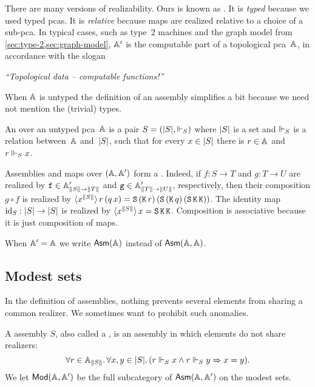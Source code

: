 There are many versions of realizability. Ours is known as . It is \emph{typed}
because we used typed pcas. It is \emph{relative} because maps are realized relative to a choice of a sub-pca. In
typical cases, such as type~2 machines and the graph model from \cref{sec:type-2,sec:graph-model}, $\subAA$ is the
computable part of a topological pca~$\AA$, in accordance with the slogan
%
\begin{center}
  \emph{``Topological data -- computable functions!''}
\end{center}

When $\AA$ is untyped the definition of an assembly simplifies a bit because we need not mention the (trivial) types.

\begin{definition}
  An  over an untyped pca~$\AA$ is a pair $S = (\S{S}, {\rz[S]})$ where $\S{S}$ is a set and $\rz[S]$ is a relation between~$\AA$ and~$\S{S}$, such that for every $x \in \S{S}$ there is $r \in \AA$ and $r \rz[S] x$.
\end{definition}

Assemblies and maps over $(\AA, \subAA)$ form a .
%
Indeed, if $f : S \to T$ and $g : T \to U$ are realized by $\R{f} \in \subAtyp{\T{S} \to \T{T}}$
and $\R{g} \in \subAtyp{\T{T} \to \T{U}}$, respectively, then their composition $g \circ f$ is realized by
$\tpcalam{x}{\T{S}}{r\,(q\,x)} = \combS\,(\combK\,r)\,(\combS\,(\combK\,q)\,(\combS\,\combK\,\combK))$.
%
The identity map $\id[S] : \S{S} \to \S{S}$ is realized by $\tpcalam{x}{\T{S}}{x} = \combS\,\combK\,\combK$. 
%
Composition is associative because it is just composition of maps.

When $\subAA = \AA$ we write $\Asm{\AA}$ instead of $\Asm{\AA,\AA}$.

\subsection{Modest sets}
\label{sec:modest-sets}

In the definition of assemblies, nothing prevents several elements from sharing a common realizer. We sometimes want
to prohibit such anomalies.

\begin{definition}
  A  assembly $S$, also called a , is an assembly in which elements do not share realizers:
  \begin{equation*}
    \all{r \in \xAtyp{S}}{
      \all{x,y \in \S{S}}
      (r \rz[S] x \land r \rz[S] y \lthen x = y)
    }.
  \end{equation*}
  We let $\ModA$ be the full subcategory of $\AsmA$ on the modest sets.
\end{definition}

